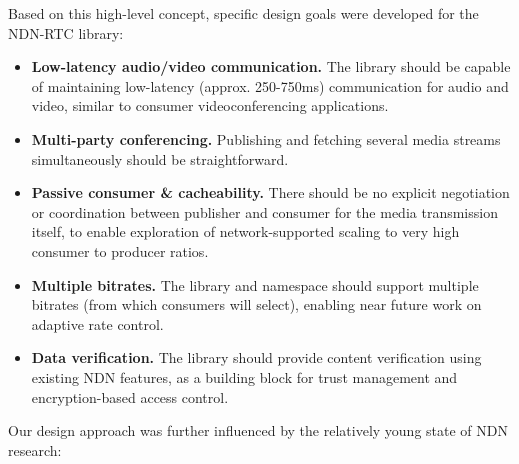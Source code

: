 \documentclass{icn/sig-alternate-2013} %
\newcommand{\ndnrtcName}{NDN-RTC} %
\begin{document}
Based on this high-level concept, specific design goals were developed for the  \ndnrtcName{} library:


\begin{itemize}

\item \textbf{Low-latency audio/video communication.} The library should be capable of maintaining low-latency (approx. 250-750ms) communication for audio and video, similar to consumer videoconferencing applications.

\item \textbf{Multi-party conferencing.} Publishing and fetching several media streams simultaneously should be straightforward.

\item \textbf{Passive consumer \& cacheability.} There should be no explicit negotiation or coordination between publisher and consumer for the media transmission itself, to enable exploration of network-supported scaling to very high consumer to producer ratios.  

\item \textbf{Multiple bitrates.} The library and namespace should support multiple bitrates (from which consumers will select), enabling near future
work on adaptive rate control. 

\item \textbf{Data verification.} The library should provide content verification using existing NDN features, as a building block for trust management and encryption-based access control.  

\end{itemize} 


Our design approach was further influenced by the relatively young state of NDN research: 
\end{document}
